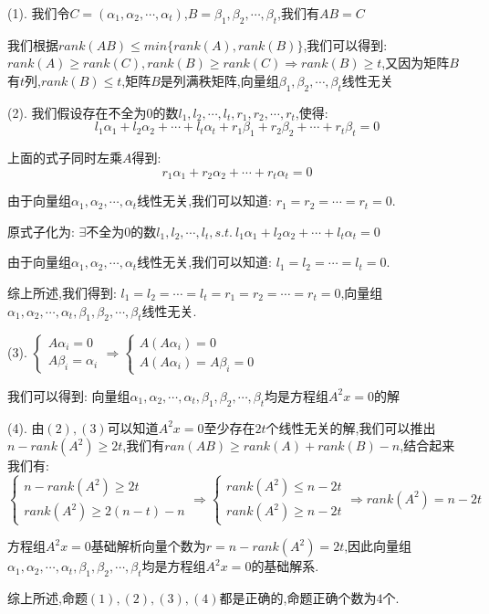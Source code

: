 \begin{solution}

	(1). 我们令$C=(\alpha_{1},\alpha_{2},\cdots,\alpha_{t})$,$B=\beta_{1},\beta_{2},\cdots,\beta_{t}$,我们有$AB=C$
	
	我们根据$rank(AB)\leq min\{rank(A),rank(B)\}$,我们可以得到:  
	$rank(A)\geq rank(C),rank(B)\geq rank(C)\Rightarrow rank(B)\geq t$,又因为矩阵$B$有$t$列,$rank(B)\leq t$,矩阵$B$是列满秩矩阵,向量组$\beta_{1},\beta_{2},\cdots,\beta_{t}$线性无关
	
	(2). 我们假设存在不全为$0$的数$l_{1},l_{2},\cdots,l_{t},r_{1},r_{2},\cdots,r_{t}$,使得:  
	$$l_{1}\alpha_{1}+l_{2}\alpha_{2}+\cdots+l_{t}\alpha_{t}+r_{1}\beta_{1}+r_{2}\beta_{2}+\cdots+r_{t}\beta_{t}=0$$
	
	上面的式子同时左乘$A$得到:  
	$$r_{1}\alpha_{1}+r_{2}\alpha_{2}+\cdots+r_{t}\alpha_{t}=0$$
	
	由于向量组$\alpha_{1},\alpha_{2},\cdots,\alpha_{t}$线性无关,我们可以知道:  $r_{1}=r_{2}=\cdots=r_{t}=0$.
	
	原式子化为:  $\exists\text{不全为}0\text{的数}l_{1},l_{2},\cdots,l_{t}, s.t.\ l_{1}\alpha_{1}+l_{2}\alpha_{2}+\cdots+l_{t}\alpha_{t}=0$
	
	由于向量组$\alpha_{1},\alpha_{2},\cdots,\alpha_{t}$线性无关,我们可以知道:  $l_{1}=l_{2}=\cdots=l_{t}=0$.
	
	综上所述,我们得到:  $l_{1}=l_{2}=\cdots=l_{t}=r_{1}=r_{2}=\cdots=r_{t}=0$,向量组$\alpha_{1},\alpha_{2},\cdots,\alpha_{t},\beta_{1},\beta_{2},\cdots,\beta_{t}$线性无关.
	
	(3). $\left\lbrace
	\begin{array}{l}
		A\alpha_{i}=0\\
		A\beta_{i}=\alpha_{i}
	\end{array}
	\right. \Rightarrow \left\lbrace
	\begin{array}{l}
		A(A\alpha_{i})=0\\
		A(A\alpha_{i})=A\beta_{i}=0
	\end{array}
	\right. $
	
	我们可以得到:  向量组$\alpha_{1},\alpha_{2},\cdots,\alpha_{t},\beta_{1},\beta_{2},\cdots,\beta_{t}$均是方程组$A^2x=0$的解
	
	(4). 由$(2),(3)$可以知道$A^2x=0$至少存在$2t$个线性无关的解,我们可以推出$n-rank(A^2)\geq 2t$,我们有$ran(AB)\geq rank(A)+rank(B)-n$,结合起来我们有:  
	$$\left\lbrace
	\begin{array}{l}
		n-rank(A^2)\geq 2t\\
		rank(A^2)\geq 2(n-t)-n
	\end{array}
	\right. \Rightarrow \left\lbrace
	\begin{array}{l}
		rank(A^2)\leq n-2t\\
		rank(A^2)\geq n-2t
	\end{array}
	\right. \Rightarrow rank(A^2)=n-2t$$
	
	方程组$A^2x=0$基础解析向量个数为$r=n-rank(A^2)=2t$,因此向量组$\alpha_{1},\alpha_{2},\cdots,\alpha_{t},\beta_{1},\beta_{2},\cdots,\beta_{t}$均是方程组$A^2x=0$的基础解系.
	
	综上所述,命题$(1),(2),(3),(4)$都是正确的,命题正确个数为$4$个.
\end{solution}


